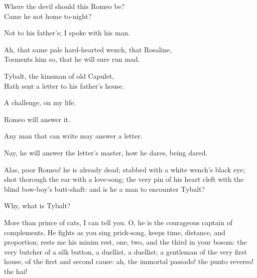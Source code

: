  
\begin{speech}
Where the devil should this Romeo be? \\
Came he not home to-night? \\
\end{speech}
\begin{speech}
Not to his father's; I spoke with his man.
\end{speech}
\begin{speech}
Ah, that same pale hard-hearted wench, that Rosaline,
\\
Torments him so, that he will sure run mad. \\
\end{speech}
\begin{speech}
Tybalt, the kinsman of old Capulet, \\
Hath sent a letter to his father's house. \\
\end{speech}
\begin{speech}
A challenge, on my life.
\end{speech}
\begin{speech}
Romeo will answer it.
\end{speech}
\begin{speech}
Any man that can write may answer a letter.
\end{speech}
\begin{speech}
Nay, he will answer the letter's master,
how he dares, being dared.
\end{speech}
\begin{speech}
Alas, poor Romeo! he is already
dead; stabbed with a white wench's black
eye; shot thorough the ear with a love-song;
the very pin of his heart cleft with the blind
bow-boy's butt-shaft: and is he a man to encounter
Tybalt?
\end{speech}
\begin{speech}
Why, what is Tybalt?
\end{speech}
\begin{speech}
More than prince of cats, I can tell
you. O, he is the courageous captain of complements.
He fights as you sing prick-song,
keeps time, distance, and proportion; rests me
his minim rest, one, two, and the third in your
bosom: the very butcher of a silk button, a
duellist, a duellist; a gentleman of the very
first house, of the first and second cause: ah,
the immortal passado! the punto reverso! the
hai!
\end{speech}
